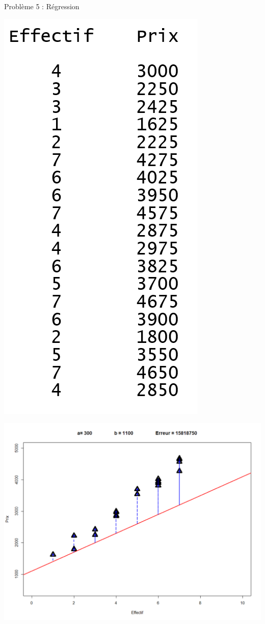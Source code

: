 \documentclass[10pt]{beamer}
\begin{document}
\begin{frame}{Problème 5 : Régression} 
\hspace{-0.12\textwidth}
\begin{minipage}{0.45\textwidth}
 \begin{center}
\includegraphics[height=\textwidth]{figures/data_coiffeur.PNG}
\end{center} 
\end{minipage}
\begin{minipage}{0.53\textwidth}
\begin{center}
\includegraphics[height=1\textwidth]{figures/reg2.PNG}
\end{center}
\end{minipage}
\end{frame}
\end{document}
